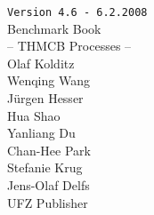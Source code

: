 \thispagestyle{empty}

\vspace*{-5mm}
\hspace*{5mm}
\unitlength=0.25mm
\linethickness{0.30mm}

\begin{center}
\texttt{Version 4.6 - 6.2.2008} \\
\vspace{7cm}
{\Title Benchmark Book
\\[5mm]
-- THMCB Processes --}
\\ \vspace{1cm}
%
{\TIbSF Olaf Kolditz \\[1mm] Wenqing Wang \\[1mm] J\"urgen Hesser \\[1mm] Hua Shao\\[1mm]
Yanliang Du \\[1mm] Chan-Hee Park \\[1mm] Stefanie Krug \\[1mm] Jens-Olaf Delfs} \\
%
\vfill
{\TIbSF UFZ Publisher}
\\[5mm]
{}

\end{center}
